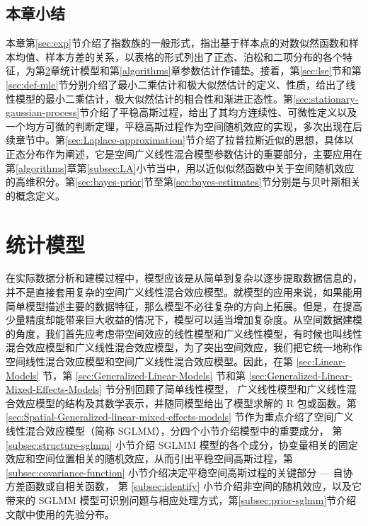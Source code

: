 \documentclass[12pt,a4paper,UTF8,twoside]{book}
\theoremstyle{definition}
\theoremstyle{definition}
\theoremstyle{definition}
\theoremstyle{remark}
\begin{document}
\hypertarget{sec:foundations}{%
\section{本章小结}\label{sec:foundations}}

本章第\ref{sec:exp}节介绍了指数族的一般形式，指出基于样本点的对数似然函数和样本均值、样本方差的关系，以表格的形式列出了正态、泊松和二项分布的各个特征，为第\ref{models}章统计模型和第\ref{algorithms}章参数估计作铺垫。接着，第\ref{sec:lse}节和第\ref{sec:def-mle}节分别介绍了最小二乘估计和极大似然估计的定义、性质，给出了线性模型的最小二乘估计，极大似然估计的相合性和渐进正态性。第\ref{sec:stationary-gaussian-process}节介绍了平稳高斯过程，给出了其均方连续性、可微性定义以及一个均方可微的判断定理，平稳高斯过程作为空间随机效应的实现，多次出现在后续章节中。第\ref{sec:Laplace-approximation}节介绍了拉普拉斯近似的思想，具体以正态分布作为阐述，它是空间广义线性混合模型参数估计的重要部分，主要应用在第\ref{algorithms}章第\ref{subsec:LA}小节当中，用以近似似然函数中关于空间随机效应的高维积分。第\ref{sec:bayes-prior}节至第\ref{sec:bayes-estimates}节分别是与贝叶斯相关的概念定义。

\hypertarget{models}{%
\chapter{统计模型}\label{models}}

在实际数据分析和建模过程中，模型应该是从简单到复杂以逐步提取数据信息的，并不是直接套用复杂的空间广义线性混合效应模型。就模型的应用来说，如果能用简单模型描述主要的数据特征，那么模型不必往复杂的方向上拓展。但是，在提高少量精度却能带来巨大收益的情况下，模型可以适当增加复杂度。从空间数据建模的角度，我们首先应考虑带空间效应的线性模型和广义线性模型，有时候也叫线性混合效应模型和广义线性混合效应模型，为了突出空间效应，我们把它统一地称作空间线性混合效应模型和空间广义线性混合效应模型。因此，在第
\ref{sec:Linear-Models} 节，第 \ref{sec:Generalized-Linear-Models}
节和第 \ref{sec:Generalized-Linear-Mixed-Effects-Models}
节分别回顾了简单线性模型，
广义线性模型和广义线性混合效应模型的结构及其数学表示，并随同模型给出了模型求解的
R 包或函数。第 \ref{sec:Spatial-Generalized-linear-mixed-effects-models}
节作为重点介绍了空间广义线性混合效应模型（简称
SGLMM），分四个小节介绍模型中的重要成分， 第
\ref{subsec:structure-sglmm} 小节介绍 SGLMM
模型的各个成分，协变量相关的固定效应和空间位置相关的随机效应，从而引出平稳空间高斯过程，第
\ref{subsec:covariance-function} 小节介绍决定平稳空间高斯过程的关键部分
--- 自协方差函数或自相关函数， 第 \ref{subsec:identify}
小节介绍非空间的随机效应，以及它带来的 SGLMM
模型可识别问题与相应处理方式，第\ref{subsec:prior-sglmm}节介绍文献中使用的先验分布。
\end{document}
